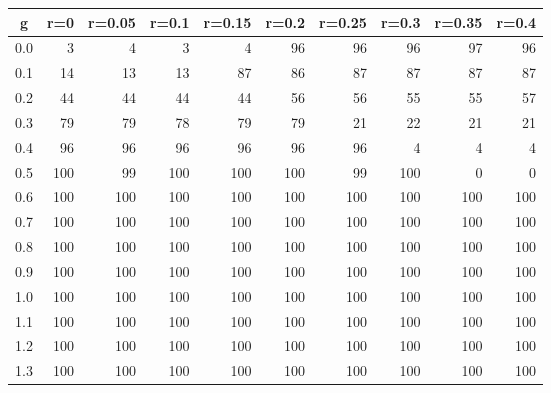 %
\begin{table}[!tbp]
 \begin{center}
 \begin{tabular}{rrrrrrrrrr}\hline\hline
\multicolumn{1}{c}{g}&\multicolumn{1}{c}{r=0}&\multicolumn{1}{c}{r=0.05}&\multicolumn{1}{c}{r=0.1}&\multicolumn{1}{c}{r=0.15}&\multicolumn{1}{c}{r=0.2}&\multicolumn{1}{c}{r=0.25}&\multicolumn{1}{c}{r=0.3}&\multicolumn{1}{c}{r=0.35}&\multicolumn{1}{c}{r=0.4}\tabularnewline
\hline
0.0&  3&  4&  3&  4& 96& 96& 96& 97& 96\tabularnewline
0.1& 14& 13& 13& 87& 86& 87& 87& 87& 87\tabularnewline
0.2& 44& 44& 44& 44& 56& 56& 55& 55& 57\tabularnewline
0.3& 79& 79& 78& 79& 79& 21& 22& 21& 21\tabularnewline
0.4& 96& 96& 96& 96& 96& 96&  4&  4&  4\tabularnewline
0.5&100& 99&100&100&100& 99&100&  0&  0\tabularnewline
0.6&100&100&100&100&100&100&100&100&100\tabularnewline
0.7&100&100&100&100&100&100&100&100&100\tabularnewline
0.8&100&100&100&100&100&100&100&100&100\tabularnewline
0.9&100&100&100&100&100&100&100&100&100\tabularnewline
1.0&100&100&100&100&100&100&100&100&100\tabularnewline
1.1&100&100&100&100&100&100&100&100&100\tabularnewline
1.2&100&100&100&100&100&100&100&100&100\tabularnewline
1.3&100&100&100&100&100&100&100&100&100\tabularnewline
\hline
\end{tabular}

\end{center}

\end{table}

